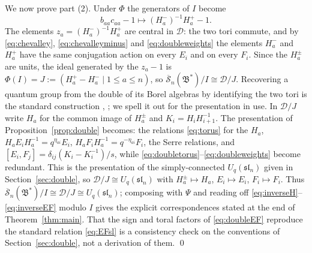 \documentclass[11pt]{article}
\theoremstyle{remark}
\newcommand{\U}{U_q}
\newcommand{\slN}{\mathfrak{sl}_n}
\newcommand{\redS}{\overline{\mathcal S}_n}
\newcommand{\Bstar}{\mathfrak B^*}
\newcommand{\cD}{\mathcal D}
\begin{document}
We now prove part (2). Under $\Phi$ the generators of $I$ become
\begin{equation}\label{eq:idealimage}
 b_{aa}c_{aa}-1\longmapsto(H^-_a)^{-1}H^+_a-1 .
\end{equation}
The elements $z_a=(H^-_a)^{-1}H^+_a$ are central in $\cD$: the two
tori commute, and by \eqref{eq:chevalley},
\eqref{eq:chevalleyminus} and \eqref{eq:doubleweights} the elements
$H^-_a$ and $H^+_a$ have the same conjugation action on every $E_i$ and
on every $F_i$. Since the $H^\pm_a$ are units, the ideal generated by
the $z_a-1$ is $\Phi(I)=J:=(H^+_a-H^-_a\mid1\le a\le n)$, so
$\redS(\Bstar)/I\cong\cD/J$. Recovering a
quantum group from the double of its Borel algebras by identifying the
two tori is the standard construction \cite[Section 13]{Dr},
\cite[Section 8.2.4]{KS}; we spell it out for the presentation in use. In $\cD/J$ write $H_a$ for the common image of
$H^\pm_a$ and $K_i=H_iH_{i+1}^{-1}$. The presentation of
Proposition~\ref{prop:double} becomes: the relations \eqref{eq:torus}
for the $H_a$, $H_aE_iH_a^{-1}=q^{\eta_{ai}}E_i$,
$H_aF_iH_a^{-1}=q^{-\eta_{ai}}F_i$, the Serre relations, and
$[E_i,F_j]=\delta_{ij}(K_i-K_i^{-1})/s$, while
\eqref{eq:doubletorus}--\eqref{eq:doubleweights} become redundant. This
is the presentation of the simply-connected $\U(\slN)$ given in
Section~\ref{sec:double}, so $\cD/J\cong\U(\slN)$ with
$H^\pm_a\mapsto H_a$, $E_i\mapsto E_i$, $F_i\mapsto F_i$.
Thus $\redS(\Bstar)/I\cong\cD/J\cong\U(\slN)$; composing with $\Psi$
and reading off \eqref{eq:inverseH}--\eqref{eq:inverseEF} modulo $I$
gives the explicit correspondences stated at the end of
Theorem~\ref{thm:main}. That the sign and toral factors of \eqref{eq:doubleEF}
reproduce the standard relation \eqref{eq:EFsl} is a consistency check
on the conventions of Section~\ref{sec:double}, not a derivation of
them. \qed
\end{document}
